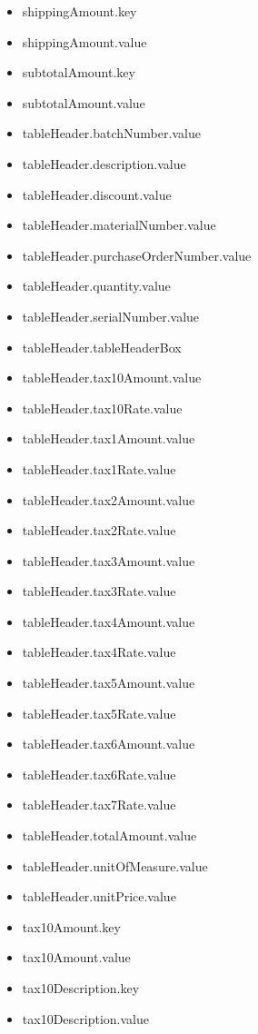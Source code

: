 \begin{multicols}{2}
\begin{itemize}
		\item[] shippingAmount.key
		\item[] shippingAmount.value
		\item[] subtotalAmount.key
		\item[] subtotalAmount.value
		\item[] tableHeader.batchNumber.value
		\item[] tableHeader.description.value
		\item[] tableHeader.discount.value
		\item[] tableHeader.materialNumber.value
		\item[] tableHeader.purchaseOrderNumber.value
		\item[] tableHeader.quantity.value
		\item[] tableHeader.serialNumber.value
		\item[] tableHeader.tableHeaderBox
		\item[] tableHeader.tax10Amount.value
		\item[] tableHeader.tax10Rate.value
		\item[] tableHeader.tax1Amount.value
		\item[] tableHeader.tax1Rate.value
		\item[] tableHeader.tax2Amount.value
		\item[] tableHeader.tax2Rate.value
		\item[] tableHeader.tax3Amount.value
		\item[] tableHeader.tax3Rate.value
		\item[] tableHeader.tax4Amount.value
		\item[] tableHeader.tax4Rate.value
		\item[] tableHeader.tax5Amount.value
		\item[] tableHeader.tax5Rate.value
		\item[] tableHeader.tax6Amount.value
		\item[] tableHeader.tax6Rate.value
		\item[] tableHeader.tax7Rate.value
		\item[] tableHeader.totalAmount.value
		\item[] tableHeader.unitOfMeasure.value
		\item[] tableHeader.unitPrice.value
		\item[] tax10Amount.key
		\item[] tax10Amount.value
		\item[] tax10Description.key
		\item[] tax10Description.value

\end{itemize}
\end{multicols}
